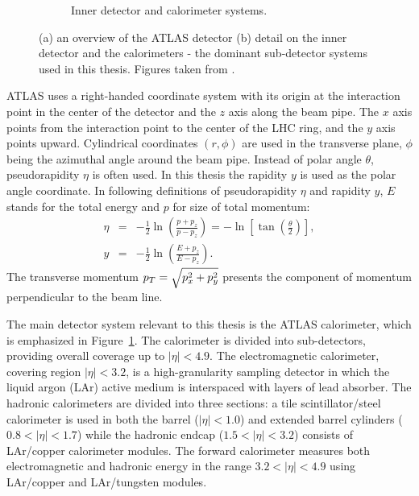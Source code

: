 \begin{figure}[p]
\begin{subfigure}[b]{0.9\textwidth}
    \caption{Inner detector and calorimeter systems.}
    \label{fig:ATLASinner}
  \end{subfigure}
  \caption[(a) an overview of the ATLAS detector 
           (b) detail on the inner detector and the calorimeters - the dominant
           sub-detector systems used in this thesis.]
           {(a) an overview of the ATLAS detector 
           (b) detail on the inner detector and the calorimeters - the dominant
           sub-detector systems used in this thesis. Figures taken from
           \cite{CERNbook}.}
  \label{fig:ATLAS}
\end{figure}

ATLAS uses a right-handed coordinate system with its origin at the interaction
point in the center of the detector and the $z$ axis along the beam pipe. The
$x$ axis points from the interaction point to the center of the LHC ring, and
the $y$ axis points upward. Cylindrical coordinates $(r, \phi)$ are used in the
transverse plane, $\phi$ being the azimuthal angle around the beam pipe. Instead
of polar angle $\theta$, pseudorapidity $\eta$ is often used. In this thesis
the rapidity $y$ is used as the polar angle coordinate. In following
definitions of pseudorapidity $\eta$ and rapidity $y$, $E$ stands for the total
energy and $p$ for size of total momentum: 
\begin{eqnarray}
  \eta &= & - \frac{1}{2} \ln \left( \frac{p+p_z}{p-p_z} \right) = - \ln \left[
  \tan \left( \frac{\theta}{2} \right) \right], \\ y &= &- \frac{1}{2} \ln
  \left( \frac{E+p_z}{E-p_z} \right).	
\end{eqnarray}
The transverse momentum $p_{T} = \sqrt{p_x^2 + p_y^2}$ presents the component of
momentum perpendicular to the beam line.  

The main detector system relevant to this thesis is the ATLAS calorimeter,
which is emphasized in Figure~\ref{fig:ATLASinner}. The calorimeter is divided
into sub-detectors, providing overall coverage up to $|\eta| < 4.9$. The
electromagnetic calorimeter, covering region $|\eta| < 3.2$, is a
high-granularity sampling detector in which the liquid argon (LAr) active medium
is interspaced with layers of lead absorber. The hadronic calorimeters are
divided into three sections: a tile scintillator/steel calorimeter is used in
both the barrel ($|\eta| < 1.0$) and extended barrel cylinders ($0.8 < |\eta| <
1.7$) while the hadronic endcap ($1.5 < |\eta| < 3.2$) consists of LAr/copper
calorimeter modules. The forward calorimeter measures both electromagnetic and
hadronic energy in the range $3.2 < |\eta| < 4.9$ using LAr/copper and
LAr/tungsten modules. 

